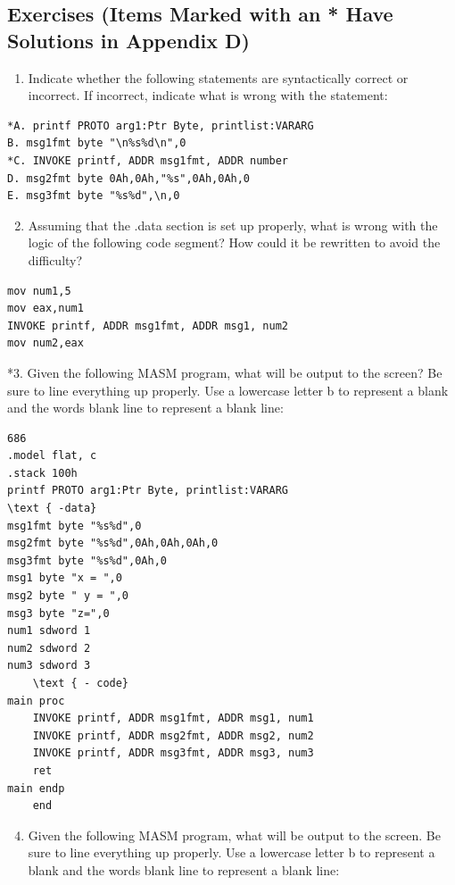\documentclass[10pt]{article}
\begin{document}
\subsection*{Exercises (Items Marked with an * Have Solutions in Appendix D)}
\begin{enumerate}
  \item Indicate whether the following statements are syntactically correct or incorrect. If incorrect, indicate what is wrong with the statement:
\end{enumerate}

\begin{verbatim}
*A. printf PROTO arg1:Ptr Byte, printlist:VARARG
B. msg1fmt byte "\n%s%d\n",0
*C. INVOKE printf, ADDR msg1fmt, ADDR number
D. msg2fmt byte 0Ah,0Ah,"%s",0Ah,0Ah,0
E. msg3fmt byte "%s%d",\n,0
\end{verbatim}

\begin{enumerate}
  \setcounter{enumi}{1}
  \item Assuming that the .data section is set up properly, what is wrong with the logic of the following code segment? How could it be rewritten to avoid the difficulty?
\end{enumerate}

\begin{verbatim}
mov num1,5
mov eax,num1
INVOKE printf, ADDR msg1fmt, ADDR msg1, num2
mov num2,eax
\end{verbatim}

*3. Given the following MASM program, what will be output to the screen? Be sure to line everything up properly. Use a lowercase letter b to represent a blank and the words blank line to represent a blank line:

\begin{verbatim}
686
.model flat, c
.stack 100h
printf PROTO arg1:Ptr Byte, printlist:VARARG
\text { -data}
msg1fmt byte "%s%d",0
msg2fmt byte "%s%d",0Ah,0Ah,0Ah,0
msg3fmt byte "%s%d",0Ah,0
msg1 byte "x = ",0
msg2 byte " y = ",0
msg3 byte "z=",0
num1 sdword 1
num2 sdword 2
num3 sdword 3
    \text { - code}
main proc
    INVOKE printf, ADDR msg1fmt, ADDR msg1, num1
    INVOKE printf, ADDR msg2fmt, ADDR msg2, num2
    INVOKE printf, ADDR msg3fmt, ADDR msg3, num3
    ret
main endp
    end
\end{verbatim}

\begin{enumerate}
  \setcounter{enumi}{3}
  \item Given the following MASM program, what will be output to the screen. Be sure to line everything up properly. Use a lowercase letter b to represent a blank and the words blank line to represent a blank line:
\end{enumerate}
\end{document}
